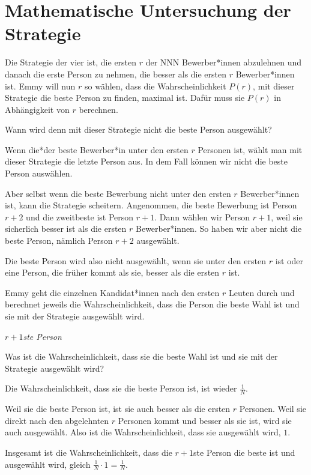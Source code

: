 \section{Mathematische Untersuchung der Strategie}
Die Strategie der vier ist, die ersten $r$ der NNN Bewerber*innen abzulehnen und danach die erste Person zu nehmen, die besser als die ersten $r$ Bewerber*innen ist. Emmy will nun $r$ so wählen, dass die Wahrscheinlichkeit $P\left(r\right)$, mit dieser Strategie die beste Person zu finden, maximal ist. Dafür muss sie $P\left(r\right)$ in Abhängigkeit von $r$ berechnen. 
\begin{verstaendnisfrageQuery}
	Wann wird denn mit dieser Strategie nicht die beste Person ausgewählt?
\end{verstaendnisfrageQuery}
\begin{antwort}
	Wenn die*der beste Bewerber*in unter den ersten $r$ Personen ist, wählt man mit dieser Strategie die letzte Person aus. In dem Fall können wir nicht die beste Person auswählen.
	
	Aber selbst wenn die beste Bewerbung nicht unter den ersten $r$ Bewerber*innen ist, kann die Strategie scheitern. Angenommen, die beste Bewerbung ist Person $r+2$ und die zweitbeste ist Person $r+1$. Dann wählen wir Person $r+1$, weil sie sicherlich besser ist als die ersten $r$ Bewerber*innen. So haben wir aber nicht die beste Person, nämlich Person $r+2$ ausgewählt.
	
	Die beste Person wird also nicht ausgewählt, wenn sie unter den ersten $r$ ist oder eine Person, die früher kommt als sie, besser als die ersten $r$ ist. 
\end{antwort}
Emmy geht die einzelnen Kandidat*innen nach den ersten $r$ Leuten durch und berechnet jeweils die Wahrscheinlichkeit, dass die Person die beste Wahl ist und sie mit der Strategie ausgewählt wird. 
\begin{box}
	\emph{$r+1$ste Person}
	
	Was ist die Wahrscheinlichkeit, dass sie die beste Wahl ist und sie mit der Strategie ausgewählt wird?
	
	Die Wahrscheinlichkeit, dass sie die beste Person ist, ist wieder $\frac 1N$​.
	
	Weil sie die beste Person ist, ist sie auch besser als die ersten $r$ Personen. Weil sie direkt nach den abgelehnten $r$ Personen kommt und besser als sie ist, wird sie auch ausgewählt. Also ist die Wahrscheinlichkeit, dass sie ausgewählt wird, $1$.
	
	Insgesamt ist die Wahrscheinlichkeit, dass die $r+1$ste Person die beste ist und ausgewählt wird, gleich $\frac{1}{N}\cdot 1=\frac{1}{N}$​.
\end{box}
